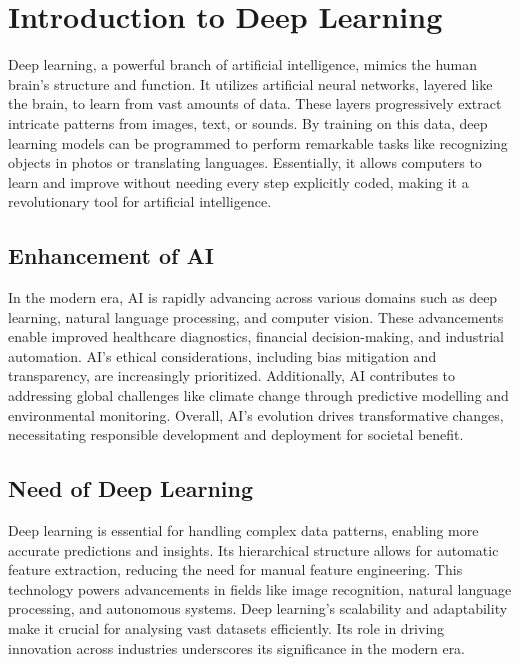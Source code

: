 \documentclass[12pt, a4paper]{report}
\begin{document}
\section{Introduction to Deep Learning}
\vspace{0.25cm}

Deep learning, a powerful branch of artificial intelligence, mimics the human brain's structure and function. It utilizes artificial neural networks, layered like the brain, to learn from vast amounts of data. These layers progressively extract intricate patterns from images, text, or sounds. By training on this data, deep learning models can be programmed to perform remarkable tasks like recognizing objects in photos or translating languages. Essentially, it allows computers to learn and improve without needing every step explicitly coded, making it a revolutionary tool for artificial intelligence.

\subsection{Enhancement of AI}

In the modern era, AI is rapidly advancing across various domains such as deep learning, natural language processing, and computer vision. These advancements enable improved healthcare diagnostics, financial decision-making, and industrial automation. AI's ethical considerations, including bias mitigation and transparency, are increasingly prioritized. Additionally, AI contributes to addressing global challenges like climate change through
predictive modelling and environmental monitoring. Overall, AI's evolution drives transformative changes, necessitating responsible development and deployment for societal benefit.

\subsection{Need of Deep Learning}

Deep learning is essential for handling complex data patterns, enabling more accurate predictions and insights. Its hierarchical structure allows for automatic feature extraction, reducing the need for manual feature engineering. This technology powers advancements in fields like image recognition, natural language processing, and autonomous systems. Deep learning's scalability and adaptability make it crucial for analysing vast datasets efficiently. Its role in driving innovation across industries underscores its significance in the modern era.
\end{document}

